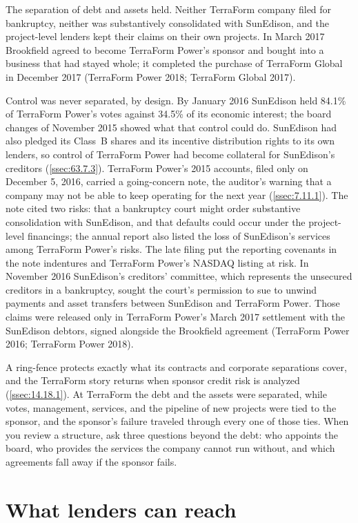 The separation of debt and assets held. Neither TerraForm company filed for bankruptcy, neither was substantively consolidated with SunEdison, and the project-level lenders kept their claims on their own projects. In March 2017 Brookfield agreed to become TerraForm Power's sponsor and bought into a business that had stayed whole; it completed the purchase of TerraForm Global in December 2017 (TerraForm Power 2018; TerraForm Global 2017).

Control was never separated, by design. By January 2016 SunEdison held 84.1\% of TerraForm Power's votes against 34.5\% of its economic interest; the board changes of November 2015 showed what that control could do. SunEdison had also pledged its Class~B shares and its incentive distribution rights to its own lenders, so control of TerraForm Power had become collateral for SunEdison's creditors (\cref{ssec:63.7.3}). TerraForm Power's 2015 accounts, filed only on December 5, 2016, carried a going-concern note, the auditor's warning that a company may not be able to keep operating for the next year (\cref{ssec:7.11.1}). The note cited two risks: that a bankruptcy court might order substantive consolidation with SunEdison, and that defaults could occur under the project-level financings; the annual report also listed the loss of SunEdison's services among TerraForm Power's risks. The late filing put the reporting covenants in the note indentures and TerraForm Power's NASDAQ listing at risk. In November 2016 SunEdison's creditors' committee, which represents the unsecured creditors in a bankruptcy, sought the court's permission to sue to unwind payments and asset transfers between SunEdison and TerraForm Power. Those claims were released only in TerraForm Power's March 2017 settlement with the SunEdison debtors, signed alongside the Brookfield agreement (TerraForm Power 2016; TerraForm Power 2018).

A ring-fence protects exactly what its contracts and corporate separations cover, and the TerraForm story returns when sponsor credit risk is analyzed (\cref{ssec:14.18.1}). At TerraForm the debt and the assets were separated, while votes, management, services, and the pipeline of new projects were tied to the sponsor, and the sponsor's failure traveled through every one of those ties. When you review a structure, ask three questions beyond the debt: who appoints the board, who provides the services the company cannot run without, and which agreements fall away if the sponsor fails.

\section{What lenders can reach}\label{sec:2.2}

